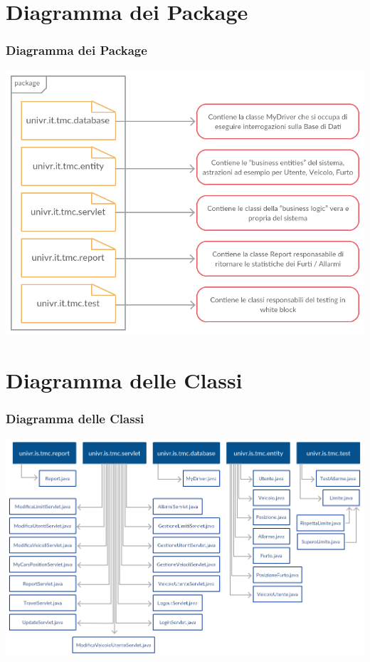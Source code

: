 \documentclass[a4paper,12pt]{beamer}
\begin{document}
\pagebreak

\section{Diagramma dei Package}
\begin{frame}
\frametitle{Diagramma dei Package}
\includegraphics[scale=.4]{packageDiagram.png}
\end{frame}

\pagebreak

\section{Diagramma delle Classi}
\begin{frame}
\frametitle{Diagramma delle Classi}
\includegraphics[scale=.3]{classDiagram.png}
\end{frame}
\end{document}

